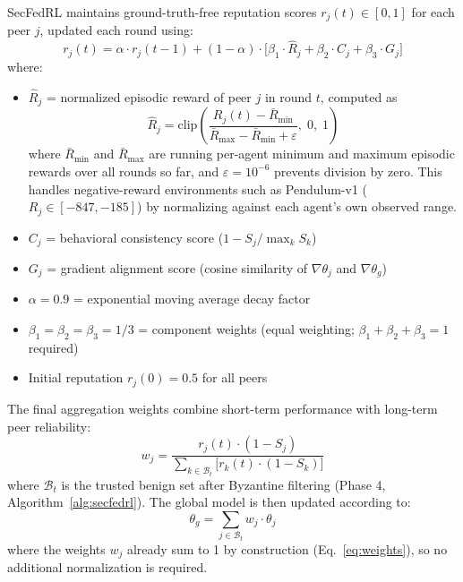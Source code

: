 \documentclass[12pt,a4paper]{article}
\begin{document}
SecFedRL maintains ground-truth-free reputation scores $r_j(t) \in [0,1]$ for each
peer $j$, updated each round using:
\begin{equation}
  r_j(t) = \alpha \cdot r_j(t-1) + (1-\alpha)\cdot
    \bigl[\beta_1 \cdot \hat{R}_j + \beta_2 \cdot C_j + \beta_3 \cdot G_j\bigr]
  \label{eq:reputation}
\end{equation}
where:
\begin{itemize}
  \item $\hat{R}_j$ = normalized episodic reward of peer $j$ in round $t$, computed as
    \begin{equation*}
      \hat{R}_j = \mathrm{clip}\!\left(\frac{R_j(t) - \bar{R}_{\min}}{\bar{R}_{\max} - \bar{R}_{\min} + \varepsilon},\;0,\;1\right)
    \end{equation*}
    where $\bar{R}_{\min}$ and $\bar{R}_{\max}$ are running per-agent minimum and maximum
    episodic rewards over all rounds so far, and $\varepsilon = 10^{-6}$ prevents
    division by zero. This handles negative-reward environments such as Pendulum-v1
    ($R_j \in [-847, -185]$) by normalizing against each agent's own observed range.
  \item $C_j$ = behavioral consistency score ($1 - S_j / \max_k S_k$)
  \item $G_j$ = gradient alignment score (cosine similarity of $\nabla\theta_j$ and $\nabla\theta_g$)
  \item $\alpha = 0.9$ = exponential moving average decay factor
  \item $\beta_1 = \beta_2 = \beta_3 = 1/3$ = component weights (equal weighting; $\beta_1+\beta_2+\beta_3=1$ required)
  \item Initial reputation $r_j(0) = 0.5$ for all peers
\end{itemize}

The final aggregation weights combine short-term performance with long-term peer
reliability:
\begin{equation}
  w_j = \frac{r_j(t)\cdot(1 - S_j)}{\displaystyle\sum_{k \in \mathcal{B}_t}
    \bigl[r_k(t)\cdot(1 - S_k)\bigr]}
  \label{eq:weights}
\end{equation}
where $\mathcal{B}_t$ is the trusted benign set after Byzantine filtering (Phase 4,
Algorithm~\ref{alg:secfedrl}). The global model is then updated according to:
\begin{equation}
  \theta_g = \sum_{j \in \mathcal{B}_t} w_j \cdot \theta_j
  \label{eq:global}
\end{equation}
where the weights $w_j$ already sum to 1 by construction (Eq.~\ref{eq:weights}),
so no additional normalization is required.
\end{document}
